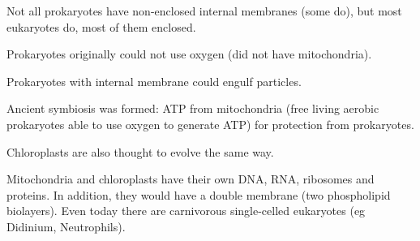 \documentclass[11pt]{scrartcl}
\begin{document}
Not all prokaryotes have non-enclosed internal membranes (some do),
but most eukaryotes do, most of them enclosed.

Prokaryotes originally could not use oxygen (did not have mitochondria).

Prokaryotes with internal membrane could engulf particles.

Ancient symbiosis was formed: ATP from mitochondria (free living
aerobic prokaryotes able to use oxygen to generate ATP) for protection
from prokaryotes.

Chloroplasts are also thought to evolve the same way.

Mitochondria and chloroplasts have their own DNA, RNA, ribosomes and
proteins. In addition, they would have a double membrane (two
phospholipid biolayers). Even today there are carnivorous
single-celled eukaryotes (eg Didinium, Neutrophils).
\end{document}
